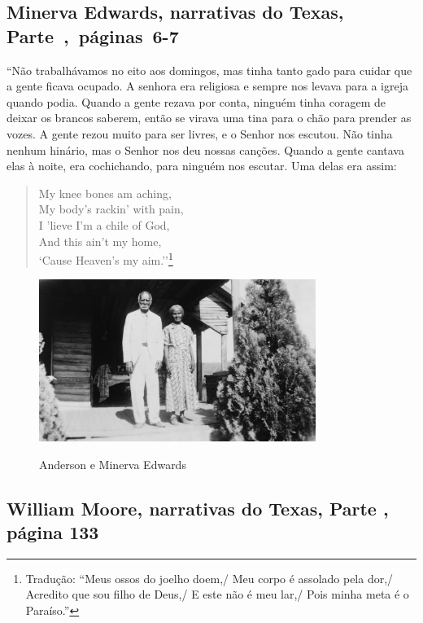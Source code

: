 \subsection{Minerva Edwards, narrativas do Texas, Parte~,~páginas~6-7} \label{ref82}

``Não trabalhávamos no eito aos domingos, mas tinha tanto gado para
cuidar que a gente ficava ocupado. A senhora era religiosa e sempre nos
levava para a igreja quando podia. Quando a gente rezava por conta,
ninguém tinha coragem de deixar os brancos saberem, então se virava uma
tina para o chão para prender as vozes. A gente rezou muito para ser
livres, e o Senhor nos escutou. Não tinha nenhum hinário, mas o Senhor
nos deu nossas canções. Quando a gente cantava elas à noite, era
cochichando, para ninguém nos escutar. Uma delas era assim:

\begin{verse}
My knee bones am aching,\\
My body's rackin' with pain,\\
I 'lieve I'm a chile of God,\\
And this ain't my home,\\
`Cause Heaven's my aim.''\footnote{Tradução: ``Meus ossos do joelho doem,/ Meu corpo é assolado pela dor,/ Acredito que sou filho de Deus,/ E este não é meu lar,/ Pois minha meta é o Paraíso.''}
\end{verse}

\begin{figure}[!ht]
\centering
 \includegraphics[width=90mm]{./imgs/anderson_minervaedwards_recorte.jpg} \label{img16}
\caption{Anderson e Minerva Edwards}
\end{figure}

\subsection{William Moore, narrativas do Texas, Parte , página 133}
\label{ref197}


